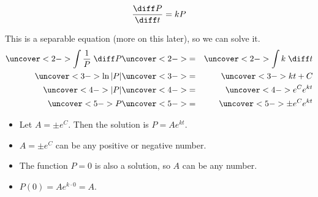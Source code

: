 \begin{frame}
\[
\frac{\diff P}{\diff t} = kP
\]

This is a separable equation (more on this later), so we can solve it.
\abovedisplayskip=0pt
\belowdisplayskip=0pt
\begin{eqnarray*}
\uncover<2->{%
\int \frac{1}{P}\;\diff P%
}%
& \uncover<2->{ = } &%
\uncover<2->{%
\int k\;\diff t%
}\\%
\uncover<3->{%
\ln |P|%
}%
& \uncover<3->{ = } &%
\uncover<3->{%
kt + C%
}\\%
\uncover<4->{%
 |P|%
}%
& \uncover<4->{ = } &%
\uncover<4->{%
e^Ce^{kt}%
}\\%
\uncover<5->{%
 P%
}%
& \uncover<5->{ = } &%
\uncover<5->{%
\pm e^Ce^{kt}%
}%
\end{eqnarray*}
\begin{itemize}
\item<6->  Let $A = \pm e^C$.  Then the solution is $P = A e^{kt}$.
\item<7->  $A = \pm e^C$ can be any positive or negative number.
\item<8->  The function $P = 0$ is also a solution, so $A$ can be any number.
\item<9->  $P(0) = Ae^{k\cdot 0} = A$.
\end{itemize}
%
\end{frame}
